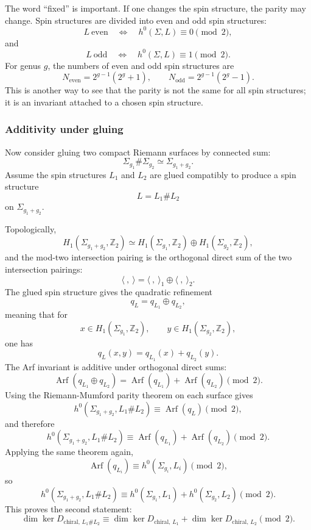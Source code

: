 \documentclass[
  10pt,
  a4paper,
  openany]{book}
\begin{document}
The word ``fixed'' is important. If one changes the spin structure, the
parity may change. Spin structures are divided into even and odd spin
structures: \[
L\ \text{even}
\quad\Longleftrightarrow\quad
h^0(\Sigma,L)\equiv 0\pmod 2,
\] and \[
L\ \text{odd}
\quad\Longleftrightarrow\quad
h^0(\Sigma,L)\equiv 1\pmod 2.
\] For genus \(g\), the numbers of even and odd spin structures are \[
N_{\text{even}}=2^{g-1}(2^g+1),
\qquad
N_{\text{odd}}=2^{g-1}(2^g-1).
\] This is another way to see that the parity is not the same for all
spin structures; it is an invariant attached to a chosen spin structure.

\subsubsection{Additivity under gluing}\label{additivity-under-gluing}

Now consider gluing two compact Riemann surfaces by connected sum: \[
\Sigma_{g_1}\#\Sigma_{g_2}\simeq\Sigma_{g_1+g_2}.
\] Assume the spin structures \(L_1\) and \(L_2\) are glued compatibly
to produce a spin structure \[
L=L_1\# L_2
\] on \(\Sigma_{g_1+g_2}\).

Topologically, \[
H_1(\Sigma_{g_1+g_2},\mathbb Z_2)
\simeq
H_1(\Sigma_{g_1},\mathbb Z_2)
\oplus
H_1(\Sigma_{g_2},\mathbb Z_2),
\] and the mod-two intersection pairing is the orthogonal direct sum of
the two intersection pairings: \[
\langle\ ,\ \rangle
=
\langle\ ,\ \rangle_1\oplus \langle\ ,\ \rangle_2.
\] The glued spin structure gives the quadratic refinement \[
q_L=q_{L_1}\oplus q_{L_2},
\] meaning that for \[
x\in H_1(\Sigma_{g_1},\mathbb Z_2),
\qquad
y\in H_1(\Sigma_{g_2},\mathbb Z_2),
\] one has \[
q_L(x,y)=q_{L_1}(x)+q_{L_2}(y).
\] The Arf invariant is additive under orthogonal direct sums: \[
\operatorname{Arf}(q_{L_1}\oplus q_{L_2})
=
\operatorname{Arf}(q_{L_1})
+
\operatorname{Arf}(q_{L_2})
\pmod 2.
\] Using the Riemann-Mumford parity theorem on each surface gives \[
h^0(\Sigma_{g_1+g_2},L_1\# L_2)
\equiv
\operatorname{Arf}(q_L)
\pmod 2,
\] and therefore \[
h^0(\Sigma_{g_1+g_2},L_1\# L_2)
\equiv
\operatorname{Arf}(q_{L_1})
+
\operatorname{Arf}(q_{L_2})
\pmod 2.
\] Applying the same theorem again, \[
\operatorname{Arf}(q_{L_i})
\equiv
h^0(\Sigma_{g_i},L_i)
\pmod 2,
\] so \[
h^0(\Sigma_{g_1+g_2},L_1\# L_2)
\equiv
h^0(\Sigma_{g_1},L_1)
+
h^0(\Sigma_{g_2},L_2)
\pmod 2.
\] This proves the second statement: \[
\boxed{
\dim\ker D_{\text{chiral},\,L_1\# L_2}
\equiv
\dim\ker D_{\text{chiral},\,L_1}
+
\dim\ker D_{\text{chiral},\,L_2}
\pmod 2.
}
\]
\end{document}
